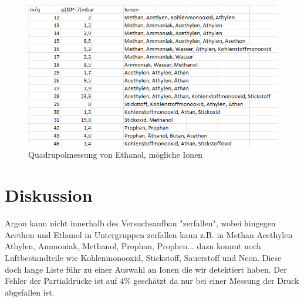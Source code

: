 \documentclass[10pt,a4paper]{article}
\begin{document}
\begin{figure}[h]
	\includegraphics[scale = 0.5]{ethanoltab.png}
	\centering
	\caption{Quadrupolmessung von Ethanol, mögliche Ionen}
	\label{ethatab}
\end{figure}

\section{Diskussion}

Argon kann nicht innerhalb des Versuchsaufbau "zerfallen", wobei hingegen Acethon und Ethanol in Untergruppen zerfallen kann z.B. in Methan Acethylen Athylen, Ammoniak, Methanol, Prophan, Prophen... dazu kommt noch Luftbestandteile wie Kohlenmonooxid, Stickstoff, Sauerstoff und Neon. Diese doch lange Liste führ zu einer Auswahl an Ionen die wir detektiert haben. Der Fehler der Partialdrücke ist auf 4\% geschätzt da nur bei einer Messung der Druck abgefallen ist.
\end{document}
